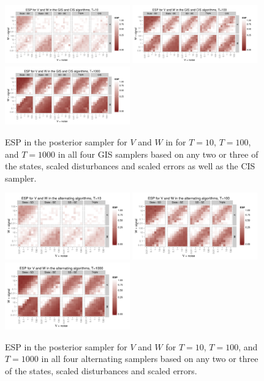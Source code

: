 \documentclass{article}
\begin{document}
\begin{figure}[!ht]
\centering
\includegraphics[width=0.48\textwidth]{../plots/intESplot10}
\includegraphics[width=0.48\textwidth]{../plots/intESplot100}
\includegraphics[width=0.48\textwidth]{../plots/intESplot1000}
\caption{ESP in the posterior sampler for $V$ and $W$ in for $T=10$, $T=100$, and $T=1000$ in all four GIS samplers based on any two or three of the states, scaled disturbances and scaled errors as well as the CIS sampler.}
\label{intESplot}
\end{figure}

\begin{figure}[!ht]
\centering
\includegraphics[width=0.48\textwidth]{../plots/altESplot10}
\includegraphics[width=0.48\textwidth]{../plots/altESplot100}
\includegraphics[width=0.48\textwidth]{../plots/altESplot1000}
\caption{ESP in the posterior sampler for $V$ and $W$ for $T=10$, $T=100$, and $T=1000$ in all four alternating samplers based on any two or three of the states, scaled disturbances and scaled errors.}
\label{altESplot}
\end{figure}
\end{document}
